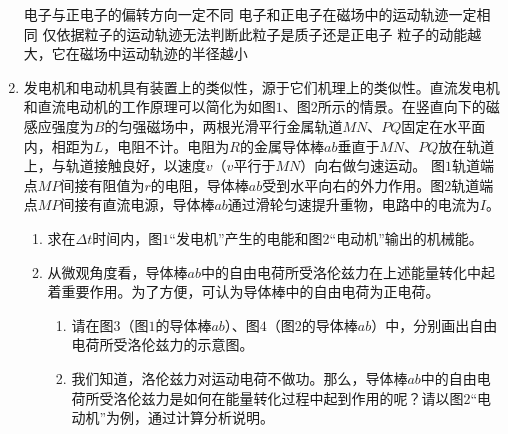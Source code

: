 \begin{enumerate}
\fourchoices
{电子与正电子的偏转方向一定不同}
{电子和正电子在磁场中的运动轨迹一定相同}
{仅依据粒子的运动轨迹无法判断此粒子是质子还是正电子}
{粒子的动能越大，它在磁场中运动轨迹的半径越小}



\newpage
\item
{}
发电机和电动机具有装置上的类似性，源于它们机理上的类似性。直流发电机和直流电动机的工作原理可以简化为如图$ 1 $、图$ 2 $所示的情景。在竖直向下的磁感应强度为$ B $的匀强磁场中，两根光滑平行金属轨道$ MN $、$ PQ $固定在水平面内，相距为$ L $，电阻不计。电阻为$ R $的金属导体棒$ ab $垂直于$ MN $、$ PQ $放在轨道上，与轨道接触良好，以速度$ v $（$ v $平行于$ MN $）向右做匀速运动。
图$ 1 $轨道端点$ MP $间接有阻值为$ r $的电阻，导体棒$ ab $受到水平向右的外力作用。图$ 2 $轨道端点$ MP $间接有直流电源，导体棒$ ab $通过滑轮匀速提升重物，电路中的电流为$ I $。
\begin{enumerate}
\renewcommand{\labelenumi}{\arabic{enumi}.}
\item
求在$ \Delta t $时间内，图$ 1 $“发电机”产生的电能和图$ 2 $“电动机”输出的机械能。
\item 
从微观角度看，导体棒$ ab $中的自由电荷所受洛伦兹力在上述能量转化中起着重要作用。为了方便，可认为导体棒中的自由电荷为正电荷。
\begin{enumerate}
\renewcommand{\labelenumiii}{\alph{enumiii}.}
\item
请在图$ 3 $（图$ 1 $的导体棒$ ab $）、图$ 4 $（图$ 2 $的导体棒$ ab $）中，分别画出自由电荷所受洛伦兹力的示意图。
\item 
我们知道，洛伦兹力对运动电荷不做功。那么，导体棒$ ab $中的自由电荷所受洛伦兹力是如何在能量转化过程中起到作用的呢？请以图$ 2 $“电动机”为例，通过计算分析说明。



\end{enumerate}

\end{enumerate}
\begin{figure}[h!]
\flushright
\qquad

\end{figure}



\end{enumerate}
